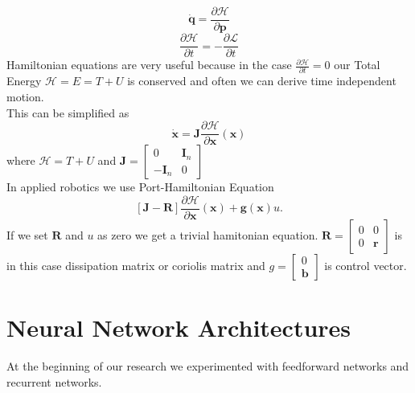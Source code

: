 \begin{equation}
	\dot{\mathbf{q}} = \frac{\partial \mathcal{H}}{\partial \mathbf{p}}
\end{equation}
\begin{equation}
	\frac{\partial\mathcal{H}}{\partial t} = - \frac{\partial\mathcal{L}}{\partial t}
\end{equation}
Hamiltonian equations are very useful because in the case $\frac{\partial\mathcal{H}}{\partial t} = 0$ our Total Energy $\mathcal{H} = E = T + U$ is conserved and often we can derive time independent motion.\\
This can be simplified as 
\begin{equation}
	\dot{\mathbf{x}} = \mathbf{J}\frac{\partial\mathcal{H}}{\partial \mathbf{x}}(\mathbf{x})
\end{equation}
where $\mathcal{H}=T+U$ and 
$\mathbf{J} = \begin{bmatrix}
	0 & \mathbf{I}_n\\
	-\mathbf{I}_n & 0
\end{bmatrix} $\\
In applied robotics we use Port-Hamiltonian Equation\cite{portham}
\begin{equation}
	\left[\mathbf{J}-\mathbf{R}\right]\frac{\partial\mathcal{H}}{\partial \mathbf{x}}(\mathbf{x}) + \mathbf{g}(\mathbf{x})u.
\end{equation}
If we set $\mathbf{R}$ and $u$ as zero we get a trivial hamitonian equation. $\mathbf{R}=\begin{bmatrix}
	0 & 0\\
	0 & \mathbf{r}
\end{bmatrix}$ is in this case dissipation matrix or coriolis matrix and $g=\begin{bmatrix}
0\\
\mathbf{b}
\end{bmatrix}$ is control vector.
\section{Neural Network Architectures}
At the beginning of our research we experimented with feedforward networks and recurrent networks.  
